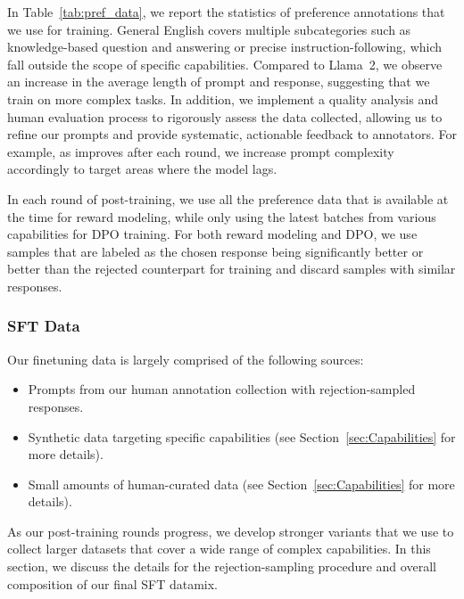 In Table~\ref{tab:pref_data}, we report the statistics of preference annotations that we use for \llamathree training. 
General English covers multiple subcategories such as knowledge-based question and answering or precise instruction-following, which fall outside the scope of specific capabilities. Compared to Llama~2, we observe an increase in the average length of prompt and response, suggesting that we train \llamathree on more complex tasks. In addition, we implement a quality analysis and human evaluation process to rigorously assess the data collected, allowing us to refine our prompts and provide systematic, actionable feedback to annotators. For example, as \llamathree improves after each round, we increase prompt complexity accordingly to target areas where the model lags.

In each round of post-training, we use all the preference data that is available at the time for reward modeling, while only using the latest batches from various capabilities for DPO training. For both reward modeling and DPO, we use samples that are labeled as the chosen response being significantly better or better than the rejected counterpart for training and discard samples with similar responses.




\subsubsection{SFT Data}
\label{subsubsec:sft_data} 

Our finetuning data is largely comprised of the following sources:

\begin{itemize}
    \item Prompts from our human annotation collection with rejection-sampled responses.
    \item Synthetic data targeting specific capabilities (see Section~\ref{sec:Capabilities} for more details).
    \item Small amounts of human-curated data (see Section~\ref{sec:Capabilities} for more details).
\end{itemize}

As our post-training rounds progress, we develop stronger \llamathree variants that we use to collect larger datasets that cover a wide range of complex capabilities. In this section, we discuss the details for the rejection-sampling procedure and overall composition of our final SFT datamix.


